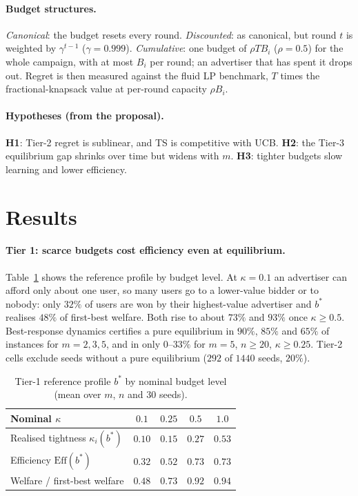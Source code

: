 \documentclass[11pt]{article}
\newcommand{\Eff}{\mathrm{Eff}}
\begin{document}
\paragraph{Budget structures.} \emph{Canonical}: the budget resets every round. \emph{Discounted}: as
canonical, but round $t$ is weighted by $\gamma^{t-1}$ ($\gamma=0.999$). \emph{Cumulative}: one budget of
$\rho TB_i$ ($\rho=0.5$) for the whole campaign, with at most $B_i$ per round; an advertiser that has spent
it drops out. Regret is then measured against the fluid LP benchmark, $T$ times the fractional-knapsack
value at per-round capacity $\rho B_i$.

\paragraph{Hypotheses (from the proposal).} \textbf{H1}: Tier-2 regret is sublinear, and TS is competitive with UCB.
\textbf{H2}: the Tier-3 equilibrium gap shrinks over time but widens with $m$.
\textbf{H3}: tighter budgets slow learning and lower efficiency.

\section{Results}\label{sec:results}

\paragraph{Tier 1: scarce budgets cost efficiency even at equilibrium.} Table~\ref{tab:t1} shows the
reference profile by budget level. At $\kappa=0.1$ an advertiser can afford only about one user,
so many users go to a lower-value bidder or to nobody: only $32\%$ of users are won by their
highest-value advertiser and $b^*$ realises $48\%$ of first-best welfare. Both rise to about $73\%$ and
$93\%$ once $\kappa\ge0.5$. Best-response dynamics certifies a pure equilibrium in $90\%$, $85\%$ and
$65\%$ of instances for $m=2,3,5$, and in only $0$--$33\%$ for $m=5$, $n\ge20$, $\kappa\ge0.25$. Tier-2
cells exclude seeds without a pure equilibrium ($292$ of $1440$ seeds, $20\%$).

\begin{table}[t]
\centering\small
\caption{Tier-1 reference profile $b^*$ by nominal budget level (mean over $m$, $n$ and $30$ seeds).}
\label{tab:t1}
\begin{tabular}{@{}lcccc@{}}
\toprule
Nominal $\kappa$ & $0.1$ & $0.25$ & $0.5$ & $1.0$\\
\midrule
Realised tightness $\kappa_i(b^*)$ & $0.10$ & $0.15$ & $0.27$ & $0.53$\\
Efficiency $\Eff(b^*)$ & $0.32$ & $0.52$ & $0.73$ & $0.73$\\
Welfare / first-best welfare & $0.48$ & $0.73$ & $0.92$ & $0.94$\\
\bottomrule
\end{tabular}
\end{table}
\end{document}
